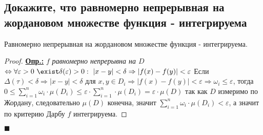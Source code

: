 
\subsection{Докажите, что равномерно непрерывная на жордановом множестве функция - интегрируема}

\begin{theorem*}
    Равномерно непрерывная на жордановом множестве функция - интегрируема.
\end{theorem*}

\begin{proof}
    \textbf{\underline{Опр.:} } $f$ \textit{равномерно непрерывна на $D$} $\Leftrightarrow\forall \varepsilon>0\ \exist\delta(\varepsilon) >0:\ |x-y|<\delta\Rightarrow |f(x)-f(y)|<\varepsilon$
    Если $\Delta(\tau) < \delta \Rightarrow |x-y|<\delta$ для $x,y\in D_i\Rightarrow |f(x)-f(y)|<\varepsilon\Rightarrow \omega_i\leq \varepsilon$, тогда
    $0\leq \sum\limits_{i=1}^n \omega_i\cdot\mu(D_i)\leq \varepsilon\cdot\sum\limits_{i=1}^n \cdot\mu(D_i)=\varepsilon\cdot\mu(D)$
    так как $D$ измеримо по Жордану, следовательно $\mu(D)$ конечна, значит $\sum\limits_{i=1}^n \omega_i\cdot\mu(D_i)<\varepsilon$, а значит по критерию Дарбу $f$ интегрируема.
\end{proof}
\begin{flushright}
$\blacksquare$
\end{flushright}
